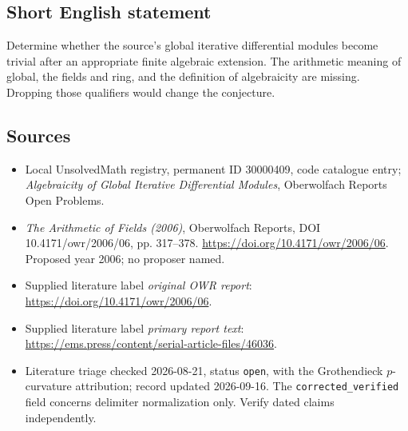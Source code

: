 \documentclass[11pt]{article}
\begin{document}
\subsection{Short English statement}
Determine whether the source's global iterative differential modules become trivial after an appropriate finite algebraic extension. The arithmetic meaning of global, the fields and ring, and the definition of algebraicity are missing. Dropping those qualifiers would change the conjecture.
\subsection{Sources}
\begin{itemize}\item Local UnsolvedMath registry, permanent ID 30000409, code catalogue entry; \emph{Algebraicity of Global Iterative Differential Modules}, Oberwolfach Reports Open Problems.\item \emph{The Arithmetic of Fields (2006)}, Oberwolfach Reports, DOI 10.4171/owr/2006/06, pp. 317--378. \url{https://doi.org/10.4171/owr/2006/06}. Proposed year 2006; no proposer named.\item Supplied literature label \emph{original OWR report}: \url{https://doi.org/10.4171/owr/2006/06}.\item Supplied literature label \emph{primary report text}: \url{https://ems.press/content/serial-article-files/46036}.\item Literature triage checked 2026-08-21, status \texttt{open}, with the Grothendieck \(p\)-curvature attribution; record updated 2026-09-16. The \texttt{corrected\_verified} field concerns delimiter normalization only. Verify dated claims independently.\end{itemize}
\end{document}
